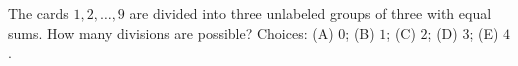 The cards $1,2,\ldots,9$ are divided into three unlabeled groups of three with equal sums. How many divisions are possible? Choices: (A) $0$; (B) $1$; (C) $2$; (D) $3$; (E) $4$.
